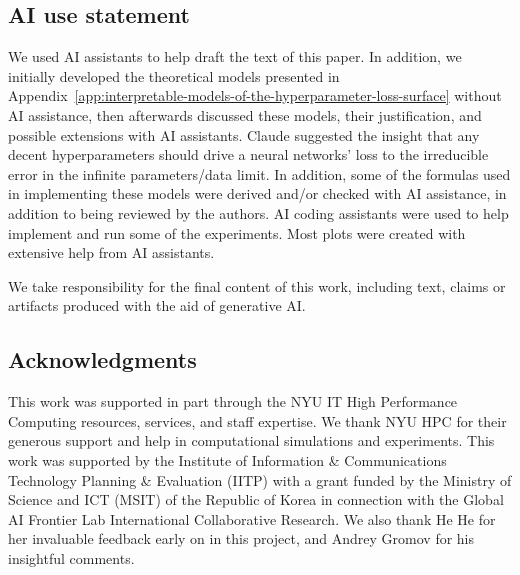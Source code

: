 \subsection*{AI use statement}

We used AI assistants to help draft the text of this paper. In addition, we initially developed the theoretical models presented in Appendix~\ref{app:interpretable-models-of-the-hyperparameter-loss-surface} without AI assistance, then afterwards discussed these models, their justification, and possible extensions with AI assistants. Claude suggested the insight that any decent hyperparameters should drive a neural networks' loss to the irreducible error in the infinite parameters/data limit. In addition, some of the formulas used in implementing these models were derived and/or checked with AI assistance, in addition to being reviewed by the authors. AI coding assistants were used to help implement and run some of the experiments. Most plots were created with extensive help from AI assistants.

We take responsibility for the final content of this work,
including text, claims or artifacts produced with the aid of generative AI.





\subsection*{Acknowledgments}

This work was supported in part through the NYU IT High Performance Computing resources, services, and staff expertise. We thank NYU HPC for their generous support and help in computational simulations and experiments. This work was supported by the Institute of Information \& Communications Technology Planning \& Evaluation (IITP) with a grant funded by the Ministry of Science and ICT (MSIT) of the Republic of Korea in connection with the Global AI Frontier Lab International Collaborative Research. We also thank He He for her invaluable feedback early on in this project, and Andrey Gromov for his insightful comments.
